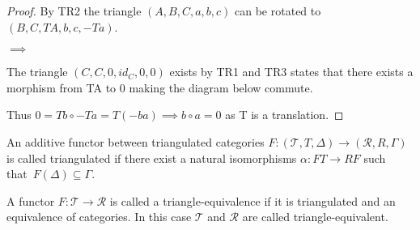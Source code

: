     \begin{proof}
        By TR2 the triangle $(A,B,C,a,b,c)$ can be rotated to $(B,C,TA,b,c,-Ta)$.
        \begin{center}
             $\implies$
        \end{center}
        The triangle $(C,C,0,id_C,0,0)$ exists by TR1 and TR3 states that there exists a morphism from TA to 0 making the diagram below commute.
        \begin{center}
        \end{center}
        Thus $0 = Tb\circ -Ta = T(-ba) \implies b\circ a = 0$ as T is a translation.
    \end{proof}
    \begin{definition}
        An additive functor between triangulated categories $F: (\mathcal{T}, T, \Delta) \rightarrow (\mathcal{R}, R, \Gamma)$ is called triangulated if there exist a natural isomorphisms $\alpha : FT \rightarrow RF$ such that $F(\Delta) \subseteq \Gamma$.

        A functor $F : \mathcal{T} \rightarrow \mathcal{R}$ is called a triangle-equivalence if it is triangulated and an equivalence of categories. In this case $\mathcal{T}$ and $\mathcal{R}$ are called triangle-equivalent.
    \end{definition}

